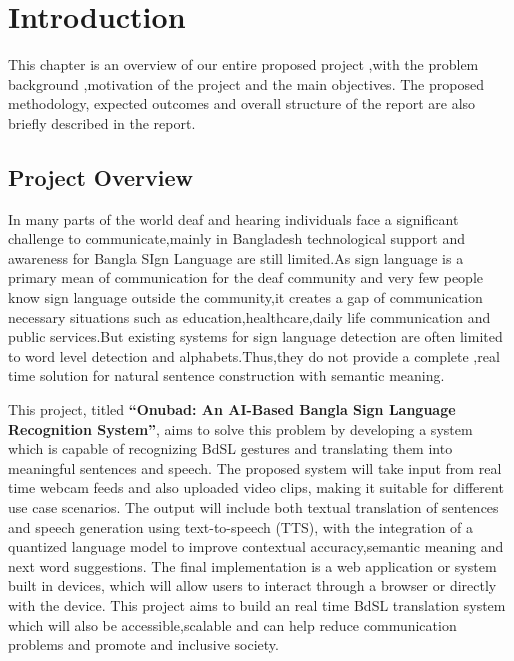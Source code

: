 \chapter{Introduction}
This chapter is an overview of our entire proposed project ,with the problem background ,motivation of the project and the main objectives. The proposed methodology, expected outcomes and overall structure of the report are also briefly described in the report.

\section{Project Overview}
In many parts of the world deaf and hearing individuals face a significant challenge to communicate,mainly in Bangladesh technological support and awareness for Bangla SIgn Language are still limited.As sign language is a primary mean of communication for the deaf community and very few people know sign language outside the community,it creates a gap of communication necessary situations such as education,healthcare,daily life communication and public services.But existing systems for sign language detection are often limited to word level detection and alphabets.Thus,they do not provide a complete ,real time solution for natural sentence construction  with semantic meaning.

This project, titled \textbf{“Onubad: An AI-Based Bangla Sign Language Recognition System”}, aims to solve this problem by developing a system which is capable of recognizing BdSL gestures and translating them into meaningful sentences and speech. The proposed system will take input from real time webcam feeds and also uploaded video clips, making it suitable for different use case scenarios. The output will include both textual translation of sentences and speech generation using text-to-speech (TTS), with the integration of a quantized language model to improve contextual accuracy,semantic meaning and next word suggestions.
The final implementation is a web application or system built in devices, which will allow users to interact through a browser or directly with the device.
This project aims to build an real time BdSL translation system which will also be accessible,scalable and can help reduce communication problems and promote and inclusive society.



